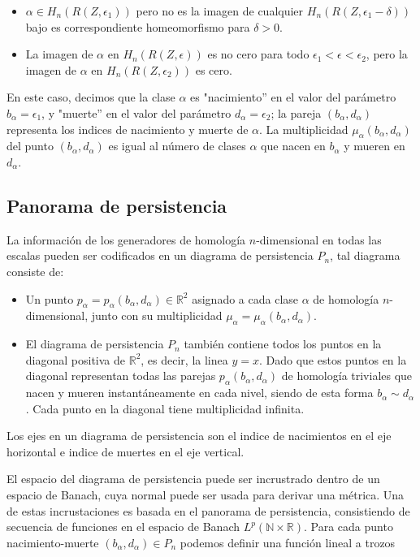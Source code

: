 \begin{itemize}
	\item $\alpha \in H_n(R(Z,\epsilon_1))$ pero no es la imagen de cualquier $H_n(R(Z,\epsilon_1-\delta))$ bajo es correspondiente homeomorfismo para $\delta > 0$.
	\item La imagen de $\alpha$ en $H_n(R(Z,\epsilon))$ es no cero para todo $\epsilon_1 < \epsilon < \epsilon_2$, pero la imagen de $\alpha$ en $H_n(R(Z,\epsilon_2))$ es cero.
\end{itemize}

En este caso, decimos que la clase $\alpha$ es "nacimiento'' en el valor del parámetro $b_\alpha = \epsilon_1$, y "muerte'' en el valor del parámetro $d_\alpha = \epsilon_2$; la pareja $(b_\alpha,d_\alpha)$ representa los indices de  nacimiento y muerte de $\alpha$. La multiplicidad $\mu_\alpha(b_\alpha,d_\alpha)$ del punto $(b_\alpha,d_\alpha)$ es igual al número de clases $\alpha$ que nacen en $b_\alpha$ y mueren en $d_\alpha$.


\subsection{Panorama de persistencia}

La información de los generadores de homología $n$-dimensional en todas las escalas pueden ser codificados en un diagrama de persistencia $P_n$, tal diagrama consiste de:

\begin{itemize}
	\item Un punto $p_\alpha = p_\alpha(b_\alpha,d_\alpha) \in \mathbb{R}^{2}$ asignado a cada clase $\alpha$ de homología $n$-dimensional, junto con su multiplicidad $\mu_\alpha = \mu_\alpha(b_\alpha,d_\alpha)$.
	
	\item El diagrama de persistencia $P_n$ también contiene todos los puntos en la diagonal positiva de $\mathbb{R}^{2}$, es decir, la linea $y=x$. Dado que estos puntos en la diagonal representan todas las parejas $p_\alpha(b_\alpha,d_\alpha)$ de homología triviales que nacen y mueren instantáneamente en cada nivel, siendo de esta forma $b_\alpha \sim d_\alpha$. Cada punto en la diagonal tiene multiplicidad infinita.
\end{itemize}

Los ejes en un diagrama de persistencia son el indice de nacimientos en el eje horizontal e indice de muertes en el eje vertical.

El espacio del diagrama de persistencia puede ser incrustrado dentro de un espacio de Banach, cuya normal puede ser usada para derivar una métrica. Una de estas incrustaciones es basada en el panorama de persistencia, consistiendo de secuencia de funciones en el espacio de Banach $L^p\left(\mathbb{N}\times  \mathbb{R}\right)$. Para cada punto nacimiento-muerte $(b_\alpha,d_\alpha) \in P_n$ podemos definir una función lineal a trozos

